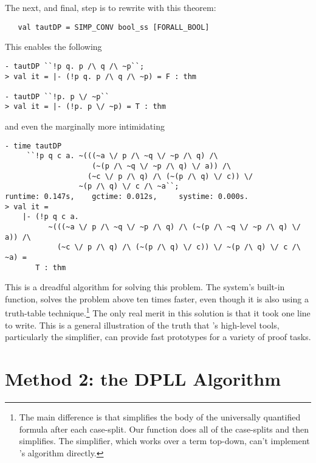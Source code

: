 The next, and final, step is to rewrite with this theorem:
\begin{hol}
\begin{verbatim}
   val tautDP = SIMP_CONV bool_ss [FORALL_BOOL]
\end{verbatim}
\end{hol}

This enables the following

\begin{session}
\begin{verbatim}
- tautDP ``!p q. p /\ q /\ ~p``;
> val it = |- (!p q. p /\ q /\ ~p) = F : thm

- tautDP ``!p. p \/ ~p``
> val it = |- (!p. p \/ ~p) = T : thm
\end{verbatim}
\end{session}
and even the marginally more intimidating
\begin{session}
\begin{verbatim}
- time tautDP
     ``!p q c a. ~(((~a \/ p /\ ~q \/ ~p /\ q) /\
                    (~(p /\ ~q \/ ~p /\ q) \/ a)) /\
                   (~c \/ p /\ q) /\ (~(p /\ q) \/ c)) \/
                 ~(p /\ q) \/ c /\ ~a``;
runtime: 0.147s,    gctime: 0.012s,     systime: 0.000s.
> val it =
    |- (!p q c a.
          ~(((~a \/ p /\ ~q \/ ~p /\ q) /\ (~(p /\ ~q \/ ~p /\ q) \/ a)) /\
            (~c \/ p /\ q) /\ (~(p /\ q) \/ c)) \/ ~(p /\ q) \/ c /\ ~a) =
       T : thm
\end{verbatim}
\end{session}

This is a dreadful algorithm for solving this problem.  The system's
built-in function,  solves the problem above
ten times faster, even though it is also using a truth-table
technique.\footnote{The main difference is that 
  simplifies the body of the universally quantified formula after each
  case-split.  Our function does all of the case-splits and then
  simplifies.  The simplifier, which works over a term top-down, can't
  implement \ml{TAUT\_CONV}'s algorithm directly.}  The only real
merit in this solution is that it took one line to write.  This is a
general illustration of the truth that \HOL{}'s high-level tools,
particularly the simplifier, can provide fast prototypes for a variety
of proof tasks.

\section{Method 2: the DPLL Algorithm}

